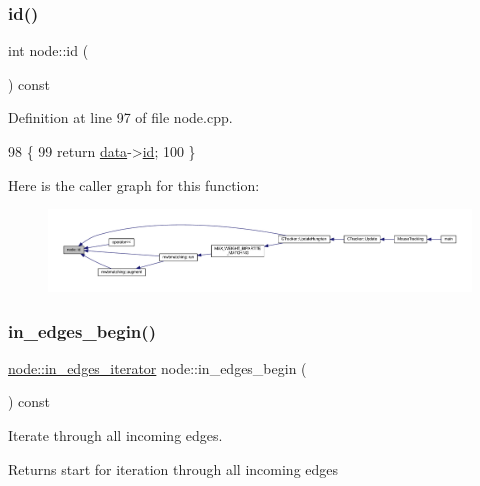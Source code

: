 \subsubsection{\texorpdfstring{id()}{id()}}
{\footnotesize\ttfamily int node\+::id (\begin{DoxyParamCaption}{ }\end{DoxyParamCaption}) const}



Definition at line 97 of file node.\+cpp.


\begin{DoxyCode}
98 \{
99     \textcolor{keywordflow}{return} \mbox{\hyperlink{classnode_a4ae3d54ebb61be3a102bedf5b91bef75}{data}}->\mbox{\hyperlink{classnode__data_ac87541ac4470e3c17df808ec9a67f6c4}{id}};
100 \}
\end{DoxyCode}
Here is the caller graph for this function\+:\nopagebreak
\begin{figure}[H]
\begin{center}
\leavevmode
\includegraphics[width=350pt]{classnode_a5d38b4152c3cedb235e45de7eb3f4469_icgraph}
\end{center}
\end{figure}
\mbox{\label{classnode_a0c32377f370ae52ed2134ff8d4dac584}} 
\subsubsection{\texorpdfstring{in\+\_\+edges\+\_\+begin()}{in\_edges\_begin()}}
{\footnotesize\ttfamily \mbox{\hyperlink{classnode_a9a96be92add7c1a2771bcd0431ebf8ab}{node\+::in\+\_\+edges\+\_\+iterator}} node\+::in\+\_\+edges\+\_\+begin (\begin{DoxyParamCaption}{ }\end{DoxyParamCaption}) const}

Iterate through all incoming edges.

\begin{DoxyReturn}{Returns}
start for iteration through all incoming edges 
\end{DoxyReturn}


